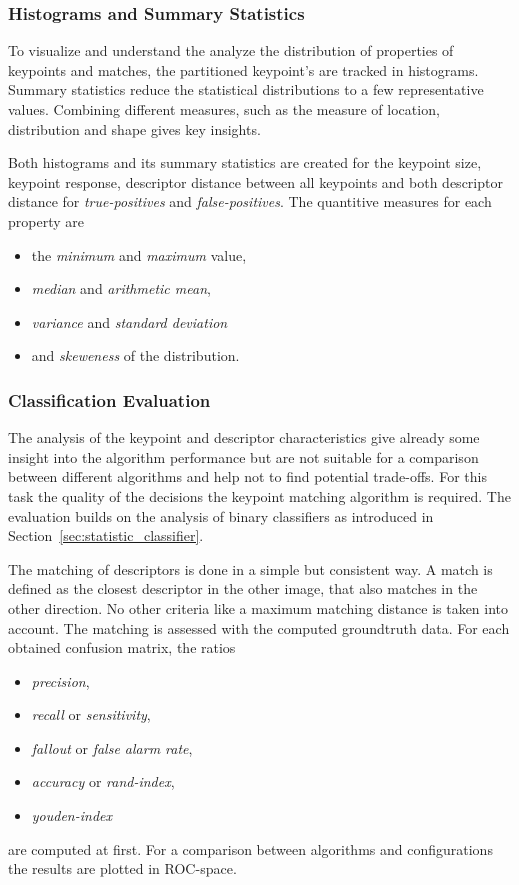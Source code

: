 \subsubsection{Histograms and Summary Statistics}

To visualize and understand the analyze the distribution of properties of keypoints and matches, the partitioned keypoint's are tracked in histograms.
Summary statistics reduce the statistical distributions to a few representative values.
Combining different measures, such as the measure of location, distribution and shape gives key insights.

Both histograms and its summary statistics are created for the keypoint size, keypoint response, descriptor distance between all keypoints and both descriptor distance for \emph{true-positives} and \emph{false-positives}.
The quantitive measures for each property are
\begin{itemize}
    \item the \emph{minimum} and \emph{maximum} value,
    \item \emph{median} and \emph{arithmetic mean},
    \item \emph{variance} and \emph{standard deviation}
    \item and \emph{skeweness} of the distribution.
\end{itemize}

\subsubsection{Classification Evaluation}

The analysis of the keypoint and descriptor characteristics give already some insight into the algorithm performance but are not suitable for a comparison between different algorithms and help not to find potential trade-offs.
For this task the quality of the decisions the keypoint matching algorithm is required.
The evaluation builds on the analysis of binary classifiers as introduced in Section~\ref{sec:statistic_classifier}.

The matching of descriptors is done in a simple but consistent way.
A match is defined as the closest descriptor in the other image, that also matches in the other direction.
No other criteria like a maximum matching distance is taken into account.
The matching is assessed with the computed groundtruth data.
For each obtained confusion matrix, the ratios
\begin{itemize}
    \item \emph{precision},
    \item \emph{recall} or \emph{sensitivity},
    \item \emph{fallout} or \emph{false alarm rate},
    \item \emph{accuracy} or \emph{rand-index},
    \item \emph{youden-index}
\end{itemize}
are computed at first.
For a comparison between algorithms and configurations the results are plotted in \gls{ROC}-space.
